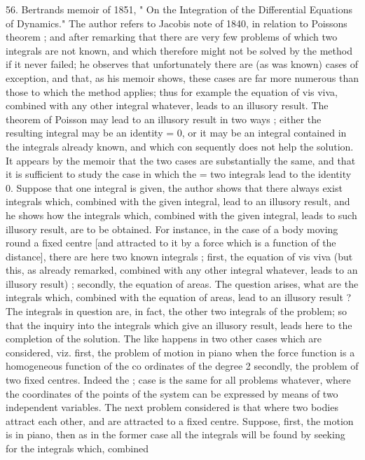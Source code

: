 \documentclass[11pt,a4paper]{book}
\begin{document}
56. Bertrands memoir of 1851, " On the Integration of the Differential Equations
of Dynamics." The author refers to Jacobis note of 1840, in relation to Poissons
theorem ; and after remarking that there are very few problems of which two integrals
are not known, and which therefore might not be solved by the method if it never
failed; he observes that unfortunately there are (as was known) cases of exception, and
that, as his memoir shows, these cases are far more numerous than those to which the
method applies; thus for example the equation of vis viva, combined with any other
integral whatever, leads to an illusory result. The theorem of Poisson may lead to
an illusory result in two ways ; either the resulting integral may be an identity = 0,
or it may be an integral contained in the integrals already known, and which con
sequently does not help the solution. It appears by the memoir that the two cases
are substantially the same, and that it is sufficient to study the case in which the
=
two integrals lead to the identity 0. Suppose that one integral is given, the
author shows that there always exist integrals which, combined with the given integral,
lead to an illusory result, and he shows how the integrals which, combined with the
given integral, leads to such illusory result, are to be obtained.
For instance, in the case of a body moving round a fixed centre [and attracted
to it by a force which is a function of the distance], there are here two known
integrals ; first, the equation of vis viva (but this, as already remarked, combined with
any other integral whatever, leads to an illusory result) ; secondly, the equation of areas.
The question arises, what are the integrals which, combined with the equation of
areas, lead to an illusory result ? The integrals in question are, in fact, the other two
integrals of the problem; so that the inquiry into the integrals which give an illusory
result, leads here to the completion of the solution.
The like happens in two other cases which are considered, viz. first, the problem
of motion in piano when the force function is a homogeneous function of the co
ordinates of the degree 2 secondly, the problem of two fixed centres. Indeed the
;
case is the same for all problems whatever, where the coordinates of the points of
the system can be expressed by means of two independent variables.
The next problem considered is that where two bodies attract each other, and are
attracted to a fixed centre. Suppose, first, the motion is in piano, then as in the
former case all the integrals will be found by seeking for the integrals which, combined
\end{document}
